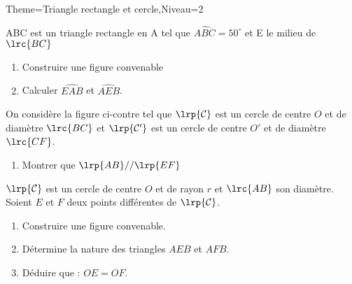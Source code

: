 \documentclass[a4paper,12pt]{article}
\begin{document}
\begin{Maquette}[Fiche]{Theme=Triangle rectangle et cercle,Niveau=2}
\begin{exercice}
ABC est un triangle rectangle en A tel que $\widehat{ABC}=50^{\circ}$ et E le milieu de $\lrc{BC}$
\begin{enumerate}
\item Construire une figure convenable
\item Calculer $\widehat{EAB}$ et $\widehat{AEB}$.
\end{enumerate}
\end{exercice}

\begin{exercice}
\begin{minipage}{0.65\linewidth}
On considère la figure ci-contre tel que $\lrp{\mathcal{C}}$ est un cercle de centre $O$ et de diamètre $\lrc{BC}$ et $\lrp{\mathcal{C'}}$ est un cercle de centre $O'$ et de diamètre $\lrc{CF}$.
\begin{enumerate}
\item Montrer que $\lrp{AB}//\lrp{EF}$
\end{enumerate}
\end{minipage}%
\begin{minipage}{0.35\linewidth}
\end{minipage}
\end{exercice}

\begin{exercice}
$\lrp{\mathcal{C}}$ est un cercle de centre $O$ et de rayon $r$ et $\lrc{AB}$ son diamètre. Soient $E$ et $F$ deux points différentes de $\lrp{\mathcal{C}}$.
\begin{enumerate}
\item Construire une figure convenable.
\item Détermine la nature des triangles $AEB$ et $AFB$.
\item Déduire que : $OE=OF$.
\end{enumerate}
\end{exercice}


\end{Maquette}
\end{document}
